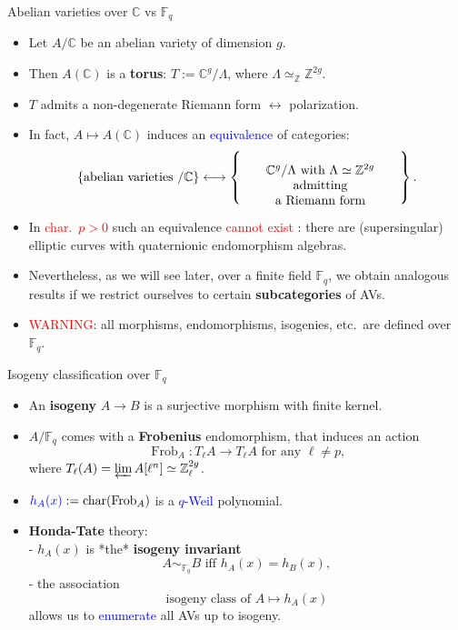 \documentclass[usenames,dvipsnames]{beamer}
\def\Z{\mathbb{Z}}
\def\C{\mathbb{C}}
\def\F{\mathbb{F}}
\DeclareMathOperator{\Char}{char}
\DeclareMathOperator{\Frob}{Frob}
\newcommand{\set}[1]{\left\lbrace#1\right\rbrace }
\newcommand{\red}[1]{\textcolor{red}{#1}}
\newcommand{\blue}[1]{\textcolor{blue}{#1}}
\begin{document}
\begin{frame}{ Abelian varieties over $\C$ vs $\F_q$ }    
    \begin{itemize}
     \item Let $A/\C$ be an abelian variety of dimension $g$. 
\pause
    \item Then $A(\C)$ is a {\bf torus}: $T:=\C^g/\Lambda$, where $\Lambda\simeq_\Z\Z^{2g}$.
\pause 
    \item $T$ admits a non-degenerate Riemann form $\longleftrightarrow$ polarization.
\pause
    \item In fact, $ A \mapsto A(\C)$ induces an \blue{equivalence} of categories:
    \vspace{-.2cm}
	  \[
      \set{ \text{abelian varieties $/\C$} } \longleftrightarrow 
      \set{\parbox[c]{12.5em}{\center $\C^g/\Lambda$ with $\Lambda\simeq \Z^{2g}$ admitting\\ a Riemann form}}.
     \]
\pause
    \vspace{-.5cm}
    \item In \red{char.~$p>0$} such an equivalence \red{cannot exist} : there are (supersingular) elliptic curves with quaternionic endomorphism algebras.
\pause 
    \item Nevertheless, as we will see later, over a finite field $\F_q$, we obtain analogous results if we restrict ourselves to certain {\bf subcategories} of AVs.
\pause
    \item \red{WARNING}: all morphisms, endomorphisms, isogenies, etc.~are defined over $\F_q$.
	\end{itemize}
\end{frame}

\begin{frame}{ Isogeny classification over $\F_q$}
	\begin{itemize}
    \item An {\bf isogeny} $A\to B$ is a surjective morphism with finite kernel.
\pause     
    \item $A/\F_{q}$ comes with a {\bf Frobenius} endomorphism, 
\pause
    that induces an action
		\[ \Frob_A : T_\ell A \rightarrow T_\ell A \text{ for any }\ell\neq p, \]
		where $T_\ell(A) = \varprojlim A[\ell^n] \simeq \Z_\ell^{2g}$.
\pause
    \item $\blue{h_A(x)}:=\Char(\Frob_A)$ is a \blue{$q$-Weil} polynomial.
\pause
    \item {\bf Honda-Tate} theory:\\
        - $h_A(x)$ is *the* {\bf isogeny invariant} 
        \[ A\sim_{\F_q} B \text{ iff } h_A(x) = h_B(x), \]
\pause
        - the association
		\[ \text{isogeny class of }A \longmapsto h_A(x) \]
		allows us to \blue{enumerate} all AVs up to isogeny.
	\end{itemize}
\end{frame}
\end{document}
